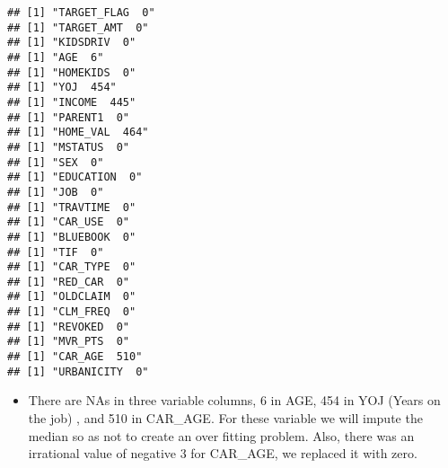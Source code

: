 \documentclass[
]{article}
\newenvironment{Shaded}{\begin{snugshade}}{\end{snugshade}}
\newcommand{\AttributeTok}[1]{\textcolor[rgb]{0.77,0.63,0.00}{#1}}
\newcommand{\ConstantTok}[1]{\textcolor[rgb]{0.00,0.00,0.00}{#1}}
\newcommand{\DecValTok}[1]{\textcolor[rgb]{0.00,0.00,0.81}{#1}}
\newcommand{\FunctionTok}[1]{\textcolor[rgb]{0.00,0.00,0.00}{#1}}
\newcommand{\NormalTok}[1]{#1}
\newcommand{\OtherTok}[1]{\textcolor[rgb]{0.56,0.35,0.01}{#1}}
\newcommand{\SpecialCharTok}[1]{\textcolor[rgb]{0.00,0.00,0.00}{#1}}
\providecommand{\tightlist}{%
  \setlength{\itemsep}{0pt}\setlength{\parskip}{0pt}}
\begin{document}
\begin{verbatim}
## [1] "TARGET_FLAG  0"
## [1] "TARGET_AMT  0"
## [1] "KIDSDRIV  0"
## [1] "AGE  6"
## [1] "HOMEKIDS  0"
## [1] "YOJ  454"
## [1] "INCOME  445"
## [1] "PARENT1  0"
## [1] "HOME_VAL  464"
## [1] "MSTATUS  0"
## [1] "SEX  0"
## [1] "EDUCATION  0"
## [1] "JOB  0"
## [1] "TRAVTIME  0"
## [1] "CAR_USE  0"
## [1] "BLUEBOOK  0"
## [1] "TIF  0"
## [1] "CAR_TYPE  0"
## [1] "RED_CAR  0"
## [1] "OLDCLAIM  0"
## [1] "CLM_FREQ  0"
## [1] "REVOKED  0"
## [1] "MVR_PTS  0"
## [1] "CAR_AGE  510"
## [1] "URBANICITY  0"
\end{verbatim}

\begin{itemize}
\tightlist
\item
  There are NAs in three variable columns, 6 in AGE, 454 in YOJ (Years
  on the job) , and 510 in CAR\_AGE. For these variable we will impute
  the median so as not to create an over fitting problem. Also, there
  was an irrational value of negative 3 for CAR\_AGE, we replaced it
  with zero.
\end{itemize}

\begin{Shaded}
\end{Shaded}
\end{document}
